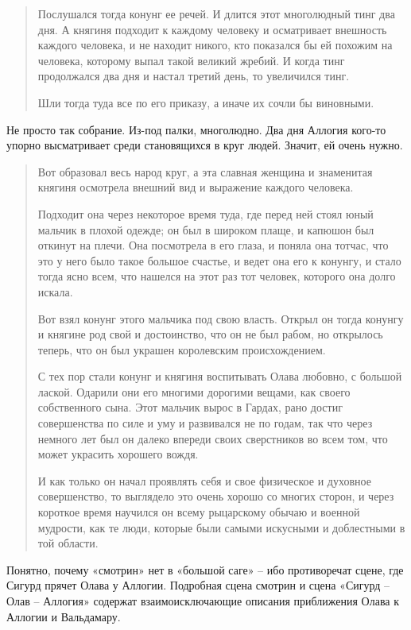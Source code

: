 \begin{quotation}
Послушался тогда конунг ее речей. И длится этот многолюдный тинг два дня. А княгиня подходит к каждому человеку и осматривает внешность каждого человека, и не находит никого, кто показался бы ей похожим на человека, которому выпал такой великий жребий. И когда тинг продолжался два дня и настал третий день, то увеличился тинг.

Шли тогда туда все по его приказу, а иначе их сочли бы виновными. 
\end{quotation}

Не просто так собрание. Из-под палки, многолюдно. Два дня Аллогия кого-то упорно высматривает среди становящихся в круг людей. Значит, ей очень нужно.

\begin{quotation}
Вот образовал весь народ круг, а эта славная женщина и знаменитая княгиня осмотрела внешний вид и выражение каждого человека.

Подходит она через некоторое время туда, где перед ней стоял юный мальчик в плохой одежде; он был в широком плаще, и капюшон был откинут на плечи. Она посмотрела в его глаза, и поняла она тотчас, что это у него было такое большое счастье, и ведет она его к конунгу, и стало тогда ясно всем, что нашелся на этот раз тот человек, которого она долго искала.

Вот взял конунг этого мальчика под свою власть. Открыл он тогда конунгу и княгине род свой и достоинство, что он не был рабом, но открылось теперь, что он был украшен королевским происхождением. 

С тех пор стали конунг и княгиня воспитывать Олава любовно, с большой лаской. Одарили они его многими дорогими вещами, как своего собственного сына. Этот мальчик вырос в Гардах, рано достиг совершенства по силе и уму и развивался не по годам, так что через немного лет был он далеко впереди своих сверстников во всем том, что может украсить хорошего вождя.

И как только он начал проявлять себя и свое физическое и духовное совершенство, то выглядело это очень хорошо со многих сторон, и через короткое время научился он всему рыцарскому обычаю и военной мудрости, как те люди, которые были самыми искусными и доблестными в той области.
\end{quotation}

Понятно, почему «смотрин» нет в «большой саге» – ибо противоречат сцене, где Сигурд прячет Олава у Аллогии. Подробная сцена смотрин и сцена «Сигурд – Олав – Аллогия» содержат взаимоисключающие описания приближения Олава к Аллогии и Вальдамару.

